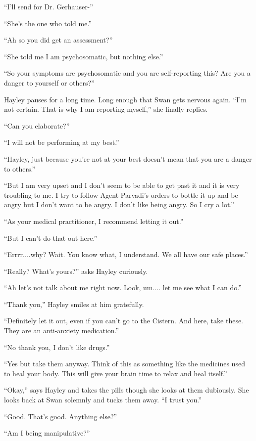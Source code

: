 ``I'll send for Dr. Gerhauser-''

``She's the one who told me.''

``Ah so you did get an assessment?''

``She told me I am psychosomatic, but nothing else.''

``So your symptoms are psychosomatic and you are self-reporting this?  Are you a danger to yourself or others?''

Hayley pauses for a long time.  Long enough that Swan gets nervous again.  ``I'm not certain.  That is why I am reporting myself,'' she finally replies.

``Can you elaborate?''

``I will not be performing at my best.''

``Hayley, just because you're not at your best doesn't mean that you are a danger to others.''

``But I am very upset and I don't seem to be able to get past it and it is very troubling to me.  I try to follow Agent Parvadi's orders to bottle it up and be angry but I don't want to be angry.  I don't like being angry.  So I cry a lot.''

``As your medical practitioner, I recommend letting it out.''

``But I can't do that out here.''

``Errrr....why?  Wait.  You know what, I understand.  We all have our safe places.''

``Really?  What's yours?'' asks Hayley curiously.

``Ah let's not talk about me right now.  Look, um.... let me see what I can do.''

``Thank you,'' Hayley smiles at him gratefully.

``Definitely let it out, even if you can't go to the Cistern.  And here, take these.  They are an anti-anxiety medication.''

``No thank you, I don't like drugs.''

``Yes but take them anyway.  Think of this as something like the medicines used to heal your body.  This will give your brain time to relax and heal itself.''

``Okay,'' says Hayley and takes the pills though she looks at them dubiously.  She looks back at Swan solemnly and tucks them away.   ``I trust you.''

``Good.  That's good.  Anything else?''

``Am I being manipulative?''

